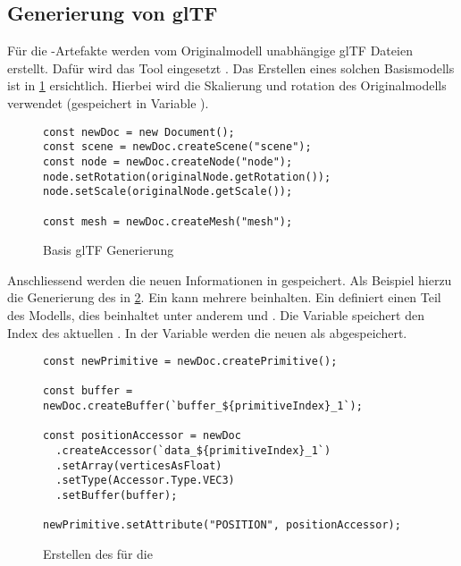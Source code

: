 \subsection{Generierung von glTF}

Für die -Artefakte werden vom Originalmodell unabhängige glTF Dateien erstellt. Dafür wird das Tool  eingesetzt \cite{gltfTransform}.
Das Erstellen eines solchen Basismodells ist in \ref{code:gltfTransform} ersichtlich. Hierbei wird die Skalierung und rotation des Originalmodells verwendet (gespeichert in Variable ).

\begin{figure}[H]
  \begin{lstlisting}[style=JavaScript]
const newDoc = new Document();
const scene = newDoc.createScene("scene");
const node = newDoc.createNode("node");
node.setRotation(originalNode.getRotation());
node.setScale(originalNode.getScale());

const mesh = newDoc.createMesh("mesh");
  \end{lstlisting}
  \caption{Basis glTF Generierung}
  \label{code:gltfTransform}
\end{figure}

Anschliessend werden die neuen Informationen in  gespeichert. Als Beispiel hierzu die Generierung des  in \ref{code:bufferCreation}. Ein  kann mehrere  beinhalten. Ein  definiert einen Teil des Modells, dies beinhaltet unter anderem  und . Die Variable  speichert den Index des aktuellen . In der Variable  werden die neuen  als  abgespeichert.

\begin{figure}[H]
  \begin{lstlisting}[style=JavaScript]
const newPrimitive = newDoc.createPrimitive();

const buffer = newDoc.createBuffer(`buffer_${primitiveIndex}_1`);

const positionAccessor = newDoc
  .createAccessor(`data_${primitiveIndex}_1`)
  .setArray(verticesAsFloat)
  .setType(Accessor.Type.VEC3)
  .setBuffer(buffer);

newPrimitive.setAttribute("POSITION", positionAccessor);
  \end{lstlisting}
  \caption{Erstellen des  für die }
  \label{code:bufferCreation}
\end{figure}

